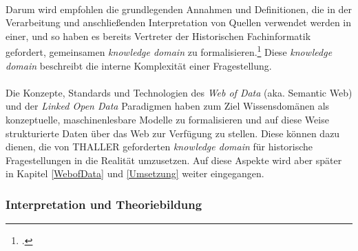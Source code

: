 \documentclass[12pt,a4paper]{article}
\begin{document}
\\
Darum wird empfohlen die grundlegenden Annahmen und Definitionen, die in der Verarbeitung und anschließenden Interpretation von Quellen verwendet werden in einer, und so haben es bereits Vertreter der Historischen Fachinformatik gefordert, gemeinsamen \textit{knowledge domain} zu formalisieren.\footcite[][S.263]{thaller2017historical} Diese \textit{knowledge domain} beschreibt die interne Komplexität einer Fragestellung.
\\
\\
Die Konzepte, Standards und Technologien des \textit{Web of Data} (aka. Semantic Web) und der \textit{Linked Open Data} Paradigmen haben zum Ziel Wissensdomänen als konzeptuelle, maschinenlesbare Modelle zu formalisieren und auf diese Weise strukturierte Daten über das Web zur Verfügung zu stellen. Diese können dazu dienen, die von THALLER geforderten \textit{knowledge domain} für historische Fragestellungen in die Realität umzusetzen. Auf diese Aspekte wird aber später in Kapitel \ref{WebofData} und \ref{Umsetzung} weiter eingegangen.

\subsubsection{Interpretation und Theoriebildung}
\end{document}
